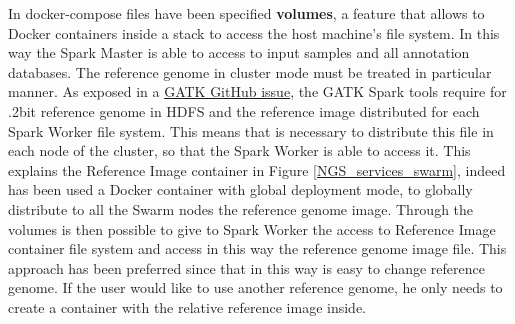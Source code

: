 In docker-compose files have been specified \textbf{volumes}, a feature that allows to Docker containers inside a stack to access the host machine's file system. In this way the Spark Master is able to access to input samples and all annotation databases.\newline
The reference genome in cluster mode must be treated in particular manner. As exposed in a \href{https://github.com/broadinstitute/gatk/issues/3186}{GATK GitHub issue}, the GATK Spark tools require for .2bit reference genome in HDFS and the reference image distributed for each Spark Worker file system. This means that is necessary to distribute this file in each node of the cluster, so that the Spark Worker is able to access it. This explains the Reference Image container in Figure \ref{NGS_services_swarm}, indeed has been used a Docker container with global deployment mode, to globally distribute to all the Swarm nodes the reference genome image. Through the volumes is then possible to give to Spark Worker the access to Reference Image container file system and access in this way the reference genome image file. This approach has been preferred since that in this way is easy to change reference genome. If the user would like to use another reference genome, he only needs to create a container with the relative reference image inside.

